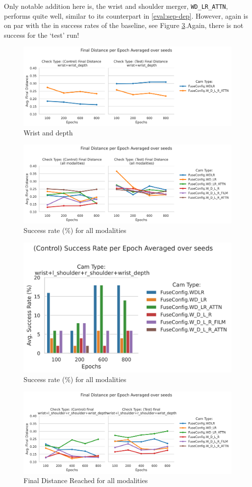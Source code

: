 Only notable addition here is, the wrist and shoulder merger, \verb|WD_LR_ATTN|, performs quite well, similar to its counterpart in \ref{eval:sep-dep}. However, again is on par with the in success rates of the baseline, see Figure \ref{fig:derivatives-all-cams-success}.Again, there is not success for the `test' run!

\begin{figure}[H]
  \centering
  \includegraphics[width=0.7\linewidth]{assets/evaluation/derivatives/grasp-normal-wd.png}
  \caption{Wrist and depth}\label{fig:deriv-normal-final-wd}
\end{figure}

\begin{figure}[H]
  \centering
  \includegraphics[width=0.7\linewidth]{assets/evaluation/derivatives/grasp-normal-allcams.png}
  \caption{Success rate (\%) for all modalities}\label{fig:deriv-normal-final-allcams}
\end{figure}

\begin{figure}[H]
  \centering
  \includegraphics[width=0.4\linewidth]{assets/evaluation/derivatives/grasp-normal-control-success-cams.png}
  \caption{Success rate (\%) for all modalities}\label{fig:derivatives-all-cams-success}
\end{figure}


\begin{figure}[H]
  \centering
  \includegraphics[width=0.7\linewidth]{assets/evaluation/derivatives/grasp-smaller-final-cams.png}
  \caption{Final Distance Reached for all modalities}\label{fig:deriv-smaller-final-allcams}
\end{figure}

